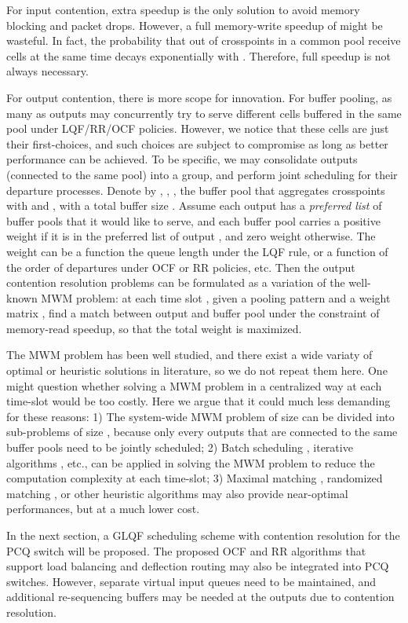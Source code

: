 \documentclass[journal,final,doublecolumn,10pt,twoside]{IEEEtranTCOM} \normalsize
\begin{document}
For input contention, extra speedup is the only solution to avoid memory blocking and packet drops. However, a full memory-write speedup of  might be wasteful. In fact, the probability that  out of  crosspoints in a common pool receive cells at the same time decays exponentially with . Therefore, full speedup is not always necessary.

For output contention, there is more scope for innovation. For  buffer pooling, as many as  outputs may concurrently try to serve different cells buffered in the same pool under LQF/RR/OCF policies. However, we notice that these cells are just their first-choices, and such choices are subject to compromise as long as better performance can be achieved. To be specific, we may consolidate  outputs (connected to the same pool) into a group, and perform joint scheduling for their departure processes. Denote by , , , the buffer pool that aggregates crosspoints  with  and , with a total buffer size . Assume each output  has a \emph{preferred list} of buffer pools that it would like to serve, and each buffer pool  carries a positive weight  if it is in the preferred list of output , and zero weight otherwise. The weight can be a function the queue length under the LQF rule, or a function of the order of departures under OCF or RR policies, etc. Then the output contention resolution problems can be formulated as a variation of the well-known MWM problem: at each time slot , given a  pooling pattern and a  weight matrix , find a match  between output  and buffer pool  under the constraint of memory-read speedup, so that the total weight  is maximized.


The MWM problem has been well studied, and there exist a wide variaty of optimal or heuristic solutions in literature, so we do not repeat them here. One might question whether solving a MWM problem in a centralized way at each time-slot would be too costly. Here we argue that it could much less demanding for these reasons:
1) The system-wide MWM problem of size  can be divided into sub-problems of size , because only every  outputs that are connected to the same buffer pools need to be jointly scheduled;
2) Batch scheduling \cite{batch}, iterative algorithms \cite{islip}, etc., can be applied in solving the MWM problem to reduce the computation complexity at each time-slot;
3) Maximal matching \cite{islip}, randomized matching \cite{disquo}, or other heuristic algorithms may also provide near-optimal performances, but at a much lower cost.

In the next section, a GLQF scheduling scheme with contention resolution for the PCQ switch will be proposed. The proposed OCF and RR algorithms that support load balancing and deflection routing may also be integrated into PCQ switches. However, separate virtual input queues need to be maintained, and additional re-sequencing buffers may be needed at the outputs due to contention resolution.
\end{document}

